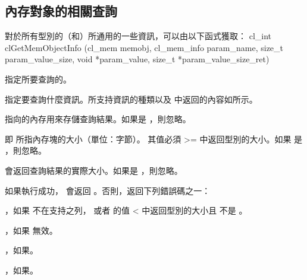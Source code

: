 \subsection{內存對象的相關查詢}

對於所有型別的（和）所通用的一些資訊，可以由以下函式獲取：
\startclc
cl_int clGetMemObjectInfo (cl_mem memobj,
			cl_mem_info param_name,
			size_t param_value_size,
			void *param_value,
			size_t *param_value_size_ret)
\stopclc

 指定所要查詢的。

 指定要查詢什麼資訊。所支持資訊的種類以及  中返回的內容如所示。

 指向的內存用來存儲查詢結果。如果是 ，則忽略。

 即  所指內存塊的大小（單位：字節）。
其值必須 >= 中返回型別的大小。如果  是 ，則忽略。

 會返回查詢結果的實際大小。如果是 ，則忽略。

如果執行成功， 會返回 。否則，返回下列錯誤碼之一：
\startigBase
\item {}，如果  不在支持之列，
  或者  的值 < 中返回型別的大小且  不是 。
\item {}，如果  無效。
\item {}，如果\scdevfailres。
\item {}，如果\schostfailres。
\stopigBase

{}

